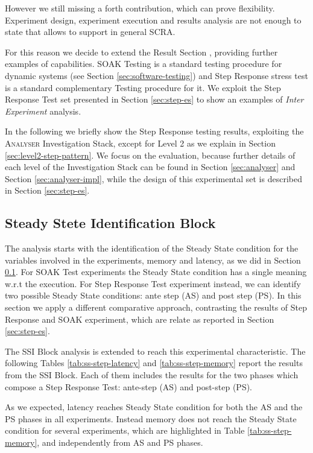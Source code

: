 However we still missing a forth contribution, which can prove \name flexibility. Experiment design, experiment execution and results analysis are not enough to state that \name allows to support in general SCRA.

For this reason we decide to extend the Result Section , providing further examples of \name capabilities. SOAK Testing is a standard testing procedure for dynamic systems (see Section \ref{sec:software-testing}) and Step Response stress test is a standard complementary Testing procedure for it. We exploit the Step Response Test set presented in Section \ref{sec:step-es}
to show an examples of \textit{Inter Experiment} analysis. 

In the following we briefly show the Step Response testing results, exploiting the \textsc{Analyser} Investigation Stack, except for Level 2 as we explain in Section \ref{sec:level2-step-pattern}. We focus on the evaluation, because further details of each level of the Investigation Stack can be found in Section \ref{sec:analyser} and Section \ref{sec:analyser-impl}, while the design of this experimental set is described in Section \ref{sec:step-es}.

\subsection{Steady Stete Identification Block}\label{sec:level0-step-ssib}

The analysis starts with the identification of the Steady State condition for the variables involved in the experiments, memory and latency, as we did in Section \ref{sec:level0-step-ssib}. For SOAK Test experiments the Steady State condition has a single meaning w.r.t the execution. For Step Response Test experiment instead, we can identify two possible Steady State conditions: ante step (AS) and post step (PS). In this section we apply a different comparative approach, contrasting the results of Step Response and SOAK experiment, which are relate as reported in Section \ref{sec:step-es}. 

The SSI Block analysis is extended to reach this experimental characteristic. The following Tables \ref{tab:ss-step-latency} and \ref{tab:ss-step-memory} report the results from the SSI Block. Each of them includes the results for the two phases which compose a Step Response Test: ante-step (AS) and post-step (PS). 

As we expected, latency reaches Steady State condition for both the AS and the PS phases in all experiments. Instead memory does not reach the Steady State condition for several experiments,  which are highlighted in Table \ref{tab:ss-step-memory}, and independently from AS and PS phases.

